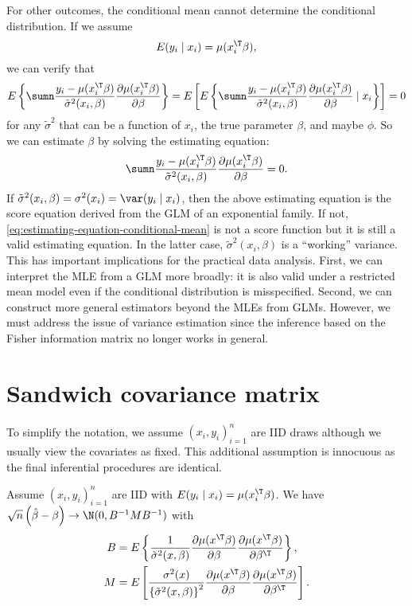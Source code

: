For other outcomes, the conditional mean cannot determine the conditional
distribution. If we assume 
\[
E(y_{i}\mid x_{i})=\mu(x_{i}^{\T}\beta),
\]
we can verify that 
\[
E\left\{ \sumn\frac{y_{i}-\mu(x_{i}^{\T}\beta)}{\tilde{\sigma}^{2} (x_i, \beta)}\frac{\partial\mu(x_{i}^{\T}\beta)}{\partial\beta}\right\} =E\left[E\left\{ \sumn\frac{y_{i}-\mu(x_{i}^{\T}\beta)}{ \tilde{\sigma}^{2} (x_i, \beta) }\frac{\partial\mu(x_{i}^{\T}\beta)}{\partial\beta}\mid x_i \right\} \right]=0
\]
for any $\tilde{\sigma}^{2}$ that can be a function of $x_{i}$, the true parameter $\beta$, and maybe $\phi$. So we can estimate $\beta$ by solving the estimating equation:
\begin{equation}
\sumn\frac{y_{i}-\mu(x_{i}^{\T}\beta)}{ \tilde{\sigma}^{2} (x_i, \beta)  }\frac{\partial\mu(x_{i}^{\T}\beta)}{\partial\beta}=0. \label{eq:estimating-equation-conditional-mean}
\end{equation}
If $\tilde{\sigma}^{2} (x_i, \beta) = \sigma^2(x_i) =\var(y_{i}\mid x_{i})$,
then the above estimating equation is the score equation derived from
the GLM of an exponential family. If not, \eqref{eq:estimating-equation-conditional-mean} is not a score function but it is still a valid estimating equation.
In the latter case, $ \tilde{\sigma}^{2} (x_i, \beta)  $ is a ``working''
variance. This has important implications for the practical data analysis.
First, we can interpret the MLE from a GLM more broadly: it is also
valid under a restricted mean model even if the conditional distribution
is misspecified. Second, we can construct more general estimators
beyond the MLEs from GLMs. However, we must address the issue of variance
estimation since the inference based on the Fisher information matrix no longer
works in general. 



\section{Sandwich covariance matrix}
\label{sec::rmm-sandwich-covariance}
 
 To simplify the notation, we assume $(x_i,y_i)_{i=1}^n$ are IID draws although we usually view the covariates as fixed. This additional assumption is innocuous as the final inferential procedures are identical. 
 
 
 \begin{theorem}
 \label{theorem::glm-sandwich}
Assume $(x_i,y_i)_{i=1}^n$ are IID with $E(y_i \mid x_i) = \mu(x_{i}^{\T}\beta)$. We have
$\sqrt{n}\left(\hat{\beta}-\beta\right)\rightarrow\N(0,B^{-1}MB^{-1})$
with
\begin{align}
B & =E\left\{ \frac{1}{\tilde{\sigma}^{2}(x, \beta)}\frac{\partial\mu(x^{\T}\beta)}{\partial\beta}\frac{\partial\mu(x^{\T}\beta)}{\partial\beta^{\T}}\right\} , \label{eq::sandwich-var-b}\\
M & =E\left[\frac{\sigma^{2}(x)}{\left\{ \tilde{\sigma}^{2}(x,  \beta)\right\} ^{2}}\frac{\partial\mu(x^{\T}\beta)}{\partial\beta}\frac{\partial\mu(x^{\T}\beta)}{\partial\beta^{\T}}\right]. \label{eq::sandwich-var-m}
\end{align}
\end{theorem}  
 
